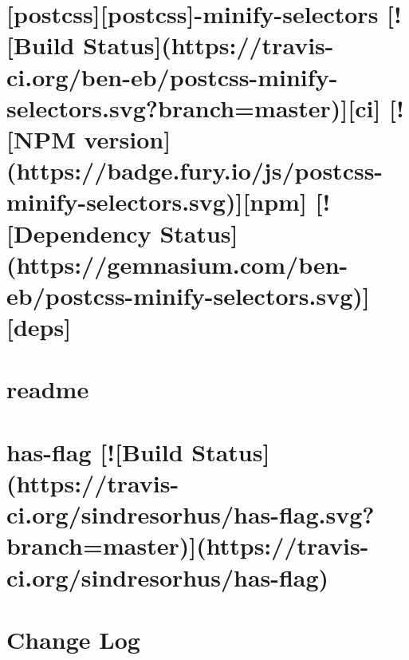 \documentclass[twoside]{book}
\newcommand{\+}{\discretionary{\mbox{\scriptsize$\hookleftarrow$}}{}{}}
\begin{document}
\chapter{\mbox{[}postcss\mbox{]}\mbox{[}postcss\mbox{]}-\/minify-\/selectors \mbox{[}!\mbox{[}Build Status\mbox{]}(https\+://travis-\/ci.org/ben-\/eb/postcss-\/minify-\/selectors.svg?branch=master)\mbox{]}\mbox{[}ci\mbox{]} \mbox{[}!\mbox{[}N\+PM version\mbox{]}(https\+://badge.fury.\+io/js/postcss-\/minify-\/selectors.svg)\mbox{]}\mbox{[}npm\mbox{]} \mbox{[}!\mbox{[}Dependency Status\mbox{]}(https\+://gemnasium.com/ben-\/eb/postcss-\/minify-\/selectors.svg)\mbox{]}\mbox{[}deps\mbox{]}}
\label{md__c_1_workspace_demo_src_main_script_node_modules_postcss-minify-selectors__r_e_a_d_m_e}

\chapter{readme}
\label{md__c_1_workspace_demo_src_main_script_node_modules_postcss-modules-extract-imports_node_modules_chalk_readme}

\chapter{has-\/flag \mbox{[}!\mbox{[}Build Status\mbox{]}(https\+://travis-\/ci.org/sindresorhus/has-\/flag.svg?branch=master)\mbox{]}(https\+://travis-\/ci.org/sindresorhus/has-\/flag)}
\label{md__c_1_workspace_demo_src_main_script_node_modules_postcss-modules-extract-imports_node_modules_has-flag_readme}

\chapter{Change Log}
\label{md__c_1_workspace_demo_src_main_script_node_modules_postcss-modules-extract-imports_node_modules_postcss__c_h_a_n_g_e_l_o_g}

\end{document}
